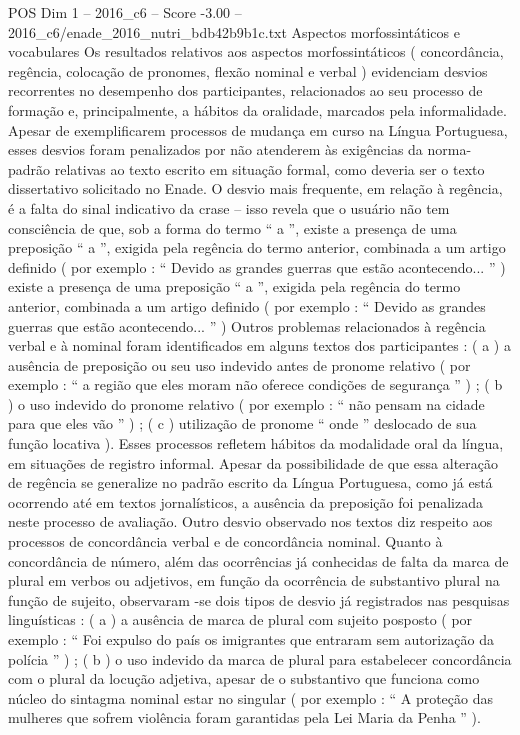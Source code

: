 \begin{textsample}{POS Dim 1 – 2016\_c6 – Score -3.00 – 2016\_c6/enade\_2016\_nutri\_bdb42b9b1c.txt}
Aspectos morfossintáticos e vocabulares Os resultados relativos aos aspectos morfossintáticos ( concordância, regência, colocação de pronomes, flexão nominal e verbal ) evidenciam desvios recorrentes no desempenho dos participantes, relacionados ao seu processo de formação e, principalmente, a hábitos da oralidade, marcados pela informalidade.
Apesar de exemplificarem processos de mudança em curso na Língua Portuguesa, esses desvios foram penalizados por não atenderem às exigências da norma-padrão relativas ao texto escrito em situação formal, como deveria ser o texto dissertativo solicitado no Enade.
O desvio mais frequente, em relação à regência, é a falta do sinal indicativo da crase – isso revela que o usuário não tem consciência de que, sob a forma do termo “ a ”, existe a presença de uma preposição “ a ”, exigida pela regência do termo anterior, combinada a um artigo definido ( por exemplo : “ Devido as grandes guerras que estão acontecendo... ” ) existe a presença de uma preposição “ a ”, exigida pela regência do termo anterior, combinada a um artigo definido ( por exemplo : “ Devido as grandes guerras que estão acontecendo... ” ) Outros problemas relacionados à regência verbal e à nominal foram identificados em alguns textos dos participantes : ( a ) a ausência de preposição ou seu uso indevido antes de pronome relativo ( por exemplo : “ a região que eles moram não oferece condições de segurança ” ) ; ( b ) o uso indevido do pronome relativo ( por exemplo : “ não pensam na cidade para que eles vão ” ) ; ( c ) utilização de pronome “ onde ” deslocado de sua função locativa ).
Esses processos refletem hábitos da modalidade oral da língua, em situações de registro informal.
Apesar da possibilidade de que essa alteração de regência se generalize no padrão escrito da Língua Portuguesa, como já está ocorrendo até em textos jornalísticos, a ausência da preposição foi penalizada neste processo de avaliação.
Outro desvio observado nos textos diz respeito aos processos de concordância verbal e de concordância nominal.
Quanto à concordância de número, além das ocorrências já conhecidas de falta da marca de plural em verbos ou adjetivos, em função da ocorrência de substantivo plural na função de sujeito, observaram -se dois tipos de desvio já registrados nas pesquisas linguísticas : ( a ) a ausência de marca de plural com sujeito posposto ( por exemplo : “ Foi expulso do país os imigrantes que entraram sem autorização da polícia ” ) ; ( b ) o uso indevido da marca de plural para estabelecer concordância com o plural da locução adjetiva, apesar de o substantivo que funciona como núcleo do sintagma nominal estar no singular ( por exemplo : “ A proteção das mulheres que sofrem violência foram garantidas pela Lei Maria da Penha ” ).

\end{textsample}
